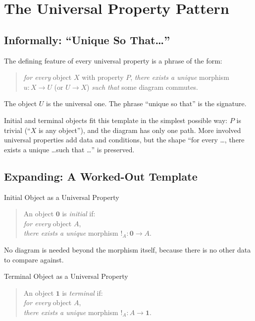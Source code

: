 \section{The Universal Property Pattern}
\label{sec:universal-pattern}

\subsection{Informally: ``Unique So That\ldots''}

The defining feature of every universal property is a phrase of the form:
\begin{quote}
  \emph{for every} object $X$ with property $P$, \emph{there exists a unique}
  morphism $u : X \to U$ (or $U \to X$) \emph{such that} some diagram
  commutes.
\end{quote}
The object $U$ is the universal one. The phrase ``unique so that'' is the
signature.

Initial and terminal objects fit this template in the simplest possible way:
$P$ is trivial (``$X$ is any object''), and the diagram has only one path.
More involved universal properties add data and conditions, but the shape
``for every \ldots, there exists a unique \ldots such that \ldots'' is
preserved.

\subsection{Expanding: A Worked-Out Template}

\begin{example}{Initial Object as a Universal Property}
\begin{quote}
  An object $\mathbf{0}$ is \emph{initial} if:\\
  \emph{for every} object $A$,\\
  \emph{there exists a unique} morphism $!_A : \mathbf{0} \to A$.
\end{quote}

No diagram is needed beyond the morphism itself, because there is no other
data to compare against.
\end{example}

\begin{example}{Terminal Object as a Universal Property}
\begin{quote}
  An object $\mathbf{1}$ is \emph{terminal} if:\\
  \emph{for every} object $A$,\\
  \emph{there exists a unique} morphism $!_A : A \to \mathbf{1}$.
\end{quote}
\end{example}


